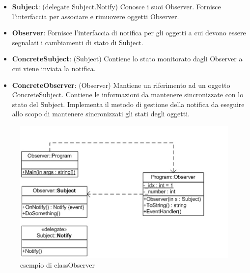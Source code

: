 \documentclass[a4paper,10pt]{article}
\begin{document}
                            \begin{itemize}
                                \item \textbf{Subject}: (delegate Subject.Notify) Conosce i suoi Observer. Fornisce l’interfaccia per associare e rimuovere oggetti Observer.
                                \item \textbf{Observer}: Fornisce l’interfaccia di notifica per gli oggetti a cui devono essere segnalati i cambiamenti di stato di Subject.
                                \item \textbf{ConcreteSubject}: (Subject) Contiene lo stato monitorato dagli Observer a cui viene inviata la notifica.
                                \item \textbf{ConcreteObserver}: (Observer) Mantiene un riferimento ad un oggetto ConcreteSubject. Contiene le informazioni da mantenere sincronizzate con lo stato del Subject. Implementa il metodo di gestione della notifica da eseguire allo scopo di mantenere sincronizzati gli stati degli oggetti.
                            \end{itemize}
                            
                            \begin{figure}[h!] %
                                \centering
                                \includegraphics[scale=0.75]{img/IC51233}	
                                \caption{esempio di classObserver}
                            \end{figure}
                    
                            \newpage
\end{document}
